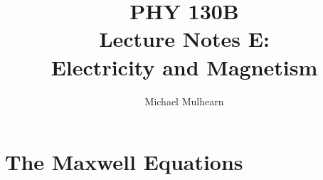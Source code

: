 \documentclass[12pt]{article}
\begin{document}
\title{PHY 130B \\ Lecture Notes E: \\
Electricity and Magnetism\\}
\author{Michael Mulhearn}

\maketitle

\setcounter{exercise}{0}

\newcommand{\exercise}{
\stepcounter{exercise}
\noindent
{\bf Exercise E.\theexercise:}
}

\section{The Maxwell Equations}
\end{document}
